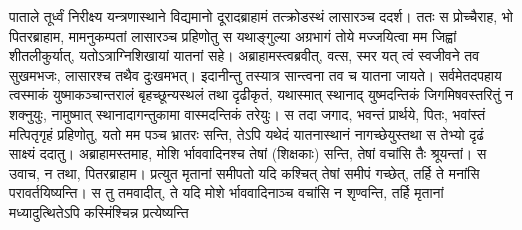 \vakya पाताले तूर्ध्वं निरीक्ष्य यन्त्रणास्थाने विद्यमानो दूरादब्राहामं तत्क्रोडस्थं लासारञ्च ददर्श।
\vakya ततः स प्रोच्चैराह, भो पितरब्राहाम, मामनुकम्पतां लासारञ्च प्रहिणोतु स यथाङ्गुल्या अग्रभागं तोये मज्जयित्वा मम जिह्वां शीतलीकुर्यात्, यतोऽत्राग्निशिखायां यातनां सहे।
\vakya अब्राहामस्त्वब्रवीत्, वत्स, स्मर यत् त्वं स्वजीवने तव सुखमभजः, लासारश्च तथैव दुःखमभत्। इदानीन्तु तस्यात्र सान्त्वना तव च यातना जायते।
\vakya सर्वमेतदपहाय त्वस्माकं युष्माकञ्चान्तरालं बृहच्छून्यस्थलं तथा दृढीकृतं, यथास्मात् स्थानाद् युष्मदन्तिकं जिगमिषवस्तरितुं न शक्नुयुः, नामुष्मात् स्थानादागन्तुकामा वास्मदन्तिकं तरेयुः।
\vakya स तदा जगाद, भवन्तं प्रार्थये, पितः, भवांस्तं मत्पितृगृहं प्रहिणोतु,
\vakya यतो मम पञ्च भ्रातरः सन्ति, तेऽपि यथेदं यातनास्थानं नागच्छेयुस्तथा स तेभ्यो दृढं साक्ष्यं ददातु।
\vakya अब्राहामस्तमाह, मोशि र्भाववादिनश्च तेषां (शिक्षकाः) सन्ति, तेषां वचांसि तैः श्रूयन्तां।
\vakya स उवाच, न तथा, पितरब्राहाम। प्रत्युत मृतानां समीपतो यदि कश्चित् तेषां समीपं गच्छेत्, तर्हि ते मनांसि परावर्तयिष्यन्ति।
\vakya स तु तमवादीत्, ते यदि मोशे र्भाववादिनाञ्च वचांसि न शृण्वन्ति, तर्हि मृतानां मध्यादुत्थितेऽपि कस्मिंश्चिन्न प्रत्येष्यन्ति\eoc